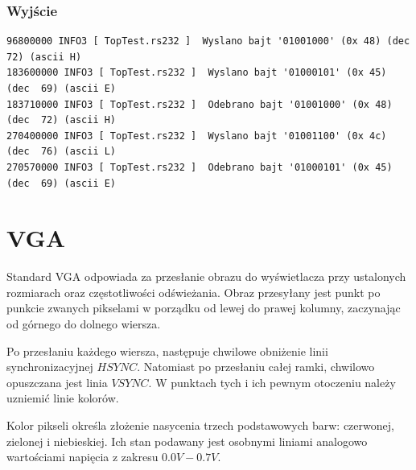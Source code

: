 \documentclass[a4paper,12pt]{article}
\begin{document}
\subsubsection{Wyjście}

\begin{verbatim}
96800000 INFO3 [ TopTest.rs232 ]  Wyslano bajt '01001000' (0x 48) (dec  72) (ascii H)
183600000 INFO3 [ TopTest.rs232 ]  Wyslano bajt '01000101' (0x 45) (dec  69) (ascii E)
183710000 INFO3 [ TopTest.rs232 ]  Odebrano bajt '01001000' (0x 48) (dec  72) (ascii H)
270400000 INFO3 [ TopTest.rs232 ]  Wyslano bajt '01001100' (0x 4c) (dec  76) (ascii L)
270570000 INFO3 [ TopTest.rs232 ]  Odebrano bajt '01000101' (0x 45) (dec  69) (ascii E)
\end{verbatim}




\newpage
\section{VGA}
Standard VGA odpowiada za przesłanie obrazu do wyświetlacza przy ustalonych rozmiarach oraz częstotliwości odświeżania. Obraz przesyłany jest punkt po punkcie zwanych pikselami w porządku od lewej do prawej kolumny, zaczynając od górnego do dolnego wiersza.

Po przesłaniu każdego wiersza, następuje chwilowe obniżenie linii synchronizacyjnej $HSYNC$. Natomiast po przesłaniu całej ramki, chwilowo opuszczana jest linia $VSYNC$. W punktach tych i ich pewnym otoczeniu należy uzniemić linie kolorów.

Kolor pikseli określa złożenie nasycenia trzech podstawowych barw: czerwonej, zielonej i niebieskiej. Ich stan podawany jest osobnymi liniami analogowo wartościami napięcia z zakresu $0.0V - 0.7V$.
\end{document}
